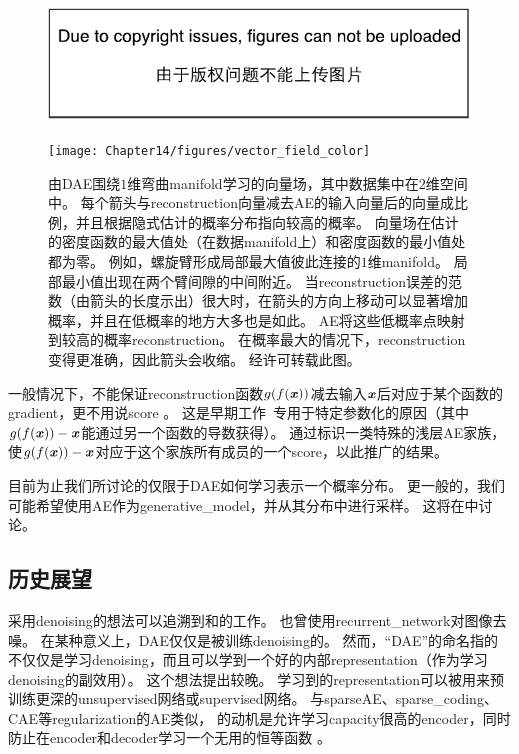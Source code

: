 \begin{figure}[!htb]
\ifOpenSource
\centerline{\includegraphics{figure.pdf}}
\else
\centerline{\texttt{[image: Chapter14/figures/vector\_field\_color]}}
\fi
\caption{由\gls{DAE}围绕$1$维弯曲\gls{manifold}学习的向量场，其中数据集中在$2$维空间中。
每个箭头与\gls{reconstruction}向量减去\gls{AE}的输入向量后的向量成比例，并且根据隐式估计的概率分布指向较高的概率。
向量场在估计的密度函数的最大值处（在数据\gls{manifold}上）和密度函数的最小值处都为零。
例如，螺旋臂形成局部最大值彼此连接的$1$维\gls{manifold}。
局部最小值出现在两个臂间隙的中间附近。
当\gls{reconstruction}误差的范数（由箭头的长度示出）很大时，在箭头的方向上移动可以显著增加概率，并且在低概率的地方大多也是如此。
\gls{AE}将这些低概率点映射到较高的概率\gls{reconstruction}。
在概率最大的情况下，\gls{reconstruction}变得更准确，因此箭头会收缩。
经\citet{Alain+Bengio-ICLR2013-small}许可转载此图。
}
\label{fig:chap14_vector_field_color}
\end{figure}

一般情况下，不能保证\gls{reconstruction}函数$g(f(\boldsymbol{\mathit{x}}))$减去输入$\boldsymbol{\mathit{x}}$后对应于某个函数的\gls{gradient}，更不用说\gls{score} 。
这是早期工作~\citep{Vincent-NC-2011-small}专用于特定参数化的原因（其中$g(f(\boldsymbol{\mathit{x}})) - \boldsymbol{\mathit{x}}$能通过另一个函数的导数获得）。
\citet{Kamyshanska+Memisevic-2015}通过标识一类特殊的浅层\gls{AE}家族，使$g(f(\boldsymbol{\mathit{x}})) - \boldsymbol{\mathit{x}}$对应于这个家族所有成员的一个\gls{score}，以此推广\citet{Vincent-NC-2011-small}的结果。


目前为止我们所讨论的仅限于\gls{DAE}如何学习表示一个概率分布。
更一般的，我们可能希望使用\gls{AE}作为\gls{generative_model}，并从其分布中进行采样。
这将在中讨论。


\subsection{历史展望}
\label{sec:historical_perspective_chap14}
采用\gls{denoising}的想法可以追溯到\cite{Lecun-these87}和\citet{Gallinari87}的工作。
\citet{Behnke-2001}也曾使用\gls{recurrent_network}对图像去噪。
在某种意义上，\gls{DAE}仅仅是被训练\gls{denoising}的。
然而，``\gls{DAE}''的命名指的不仅仅是学习\gls{denoising}，而且可以学到一个好的内部\gls{representation}（作为学习\gls{denoising}的副效用）。
这个想法提出较晚\citep{VincentPLarochelleH2008-small,Vincent-JMLR-2010-small}。
学习到的\gls{representation}可以被用来预训练更深的\gls{unsupervised}网络或\gls{supervised}网络。
与\gls{sparse}\gls{AE}、\gls{sparse_coding}、\gls{CAE}等\gls{regularization}的\gls{AE}类似， 的动机是允许学习\gls{capacity}很高的\gls{encoder}，同时防止在\gls{encoder}和\gls{decoder}学习一个无用的恒等函数 。


